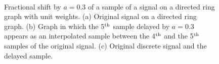 \begin{figure}[b]
    \centering
    \\
    \caption{Fractional shift by $a=0{.}3 $ of a sample of a signal on a directed ring graph with unit weights. (a) Original signal on a directed ring graph. (b) Graph in which the 5$\textsuperscript{th}$ sample delayed by $a=0{.}3 $ appears as an interpolated sample between the 4$\textsuperscript{th}$ and the 5$\textsuperscript{th}$ samples of the original signal. (c) Original discrete signal and the delayed sample.}
    \label{fig:frac_delay_directed}
\end{figure}

